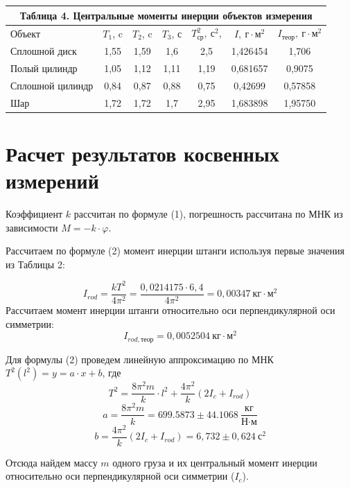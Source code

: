 \documentclass[a4paper,14pt]{article}
\begin{document}
    \begin{center}
        \begin{tabular}{|p{6.89em}|c|c|c|c|c|c|}
            \multicolumn{7}{c}{Таблица 4. Центральные моменты инерции объектов измерения} \bigstrut[b]\\
            \hline
            \multicolumn{1}{|l|}{Объект } & $T_{1}$, c & $T_{2}$, c & $T_{3}$, с & $T_{\text{ср}}^2, \ \text{с}^2$,  & $I,\ \text{г}\cdot\text{м}^2$ & $I_{\text{теор}},\ \text{г}\cdot\text{м}^2$ \bigstrut\\
            \hline
            Сплошной диск & 1,55 & 1,59 & 1,6 & 2,5 & 1,426454 & 1,706 \bigstrut\\
            \hline
            Полый цилиндр & 1,05 & 1,12 & 1,11 & 1,19 & 0,681657 & 0,9075 \bigstrut\\
            \hline
            Сплошной цилиндр & 0,84 & 0,87 & 0,88 & 0,75 & 0,42699 & 0,57858 \bigstrut\\
            \hline
            Шар   & 1,72 & 1,72 & 1,7 & 2,95& 1,683898 & 1,95750 \bigstrut\\
            \hline
        \end{tabular}%
    \end{center}


    \section{Расчет результатов косвенных измерений}

    Коэффициент $k$ рассчитан по формуле (1), погрешность рассчитана по МНК из зависимости $M = -k\cdot \varphi$.

    Рассчитаем по формуле (2) момент инерции штанги используя первые значения из Таблицы 2:

    \[I_{rod} = \frac{kT^2}{4\pi^2} = \frac{0,0214175\cdot6,4}{4\pi^2} = 0,00347\ \text{кг}\cdot\text{м}^2\]
    Рассчитаем момент инерции штанги относительно оси перпендикулярной оси симметрии:
    \[I_{rod, \text{теор}} = 0,0052504 \ \text{кг}\cdot\text{м}^2\]

    Для формулы (2) проведем линейную аппроксимацию по МНК $T^2(l^2) = y = a\cdot x + b$, где
    \[T^2 = \frac{8\pi^2m}{k}\cdot l^2 + \frac{4\pi^2}{k}(2I_{c} + I_{rod})\]
    \[a = \frac{8\pi^2m}{k} = 699.5873 \pm 44.1068 \ \frac{\text{кг}}{\text{Н}\cdot\text{м}} \]
    \[b = \frac{4\pi^2}{k}(2I_{c} + I_{rod}) = 6,732 \pm 0,624 \ \text{с}^2\]

    Отсюда найдем массу $m$ одного груза и их центральный момент инерции относительно оси перпендикулярной оси симметрии ($I_{c}$).
\end{document}

